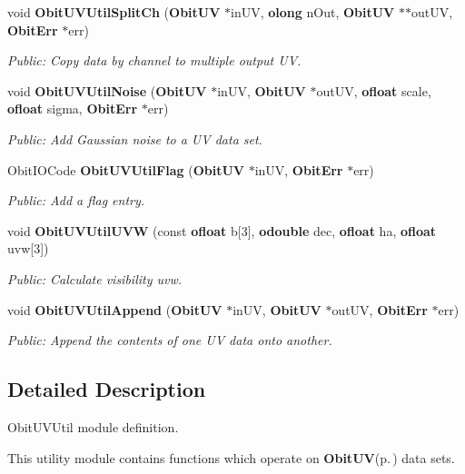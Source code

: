 \begin{CompactItemize}
void {\bf Obit\-UVUtil\-Split\-Ch} ({\bf Obit\-UV} $\ast$in\-UV, {\bf olong} n\-Out, {\bf Obit\-UV} $\ast$$\ast$out\-UV, {\bf Obit\-Err} $\ast$err)
\begin{CompactList}\small\item\em Public: Copy data by channel to multiple output UV. \item\end{CompactList}\item 
void {\bf Obit\-UVUtil\-Noise} ({\bf Obit\-UV} $\ast$in\-UV, {\bf Obit\-UV} $\ast$out\-UV, {\bf ofloat} scale, {\bf ofloat} sigma, {\bf Obit\-Err} $\ast$err)
\begin{CompactList}\small\item\em Public: Add Gaussian noise to a UV data set. \item\end{CompactList}\item 
Obit\-IOCode {\bf Obit\-UVUtil\-Flag} ({\bf Obit\-UV} $\ast$in\-UV, {\bf Obit\-Err} $\ast$err)
\begin{CompactList}\small\item\em Public: Add a flag entry. \item\end{CompactList}\item 
void {\bf Obit\-UVUtil\-UVW} (const {\bf ofloat} b[3], {\bf odouble} dec, {\bf ofloat} ha, {\bf ofloat} uvw[3])
\begin{CompactList}\small\item\em Public: Calculate visibility uvw. \item\end{CompactList}\item 
void {\bf Obit\-UVUtil\-Append} ({\bf Obit\-UV} $\ast$in\-UV, {\bf Obit\-UV} $\ast$out\-UV, {\bf Obit\-Err} $\ast$err)
\begin{CompactList}\small\item\em Public: Append the contents of one UV data onto another. \item\end{CompactList}\end{CompactItemize}


\subsection{Detailed Description}
Obit\-UVUtil module definition. 

This utility module contains functions which operate on {\bf Obit\-UV}{\rm (p.\,\pageref{structObitUV})} data sets.

